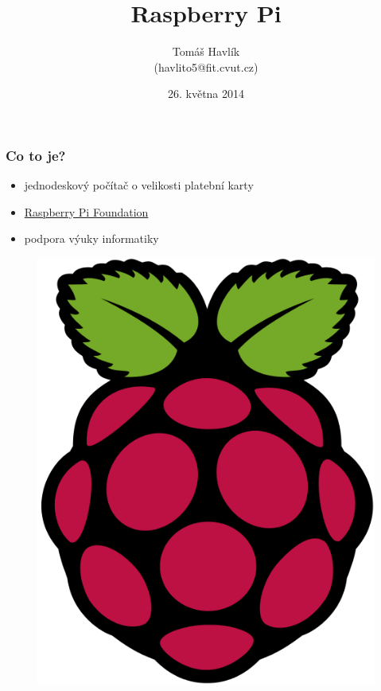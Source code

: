 \documentclass{beamer}
\title{Raspberry Pi}
\date{26. května 2014}
\author{Tomáš Havlík \\(havlito5@fit.cvut.cz)}
\begin{document}
\begin{frame}
\titlepage
\end{frame}

\begin{frame}\frametitle{Co to je?}
\begin{itemize}
\item jednodeskový počítač o velikosti platební karty
\item \href{http://raspberrypi.org}{Raspberry Pi Foundation}
\item podpora výuky informatiky
\end{itemize}
\begin{figure}[htp]
\centering
\includegraphics[scale=.2]{rpi_logo.png}
\end{figure}
\end{frame}
\end{document}
